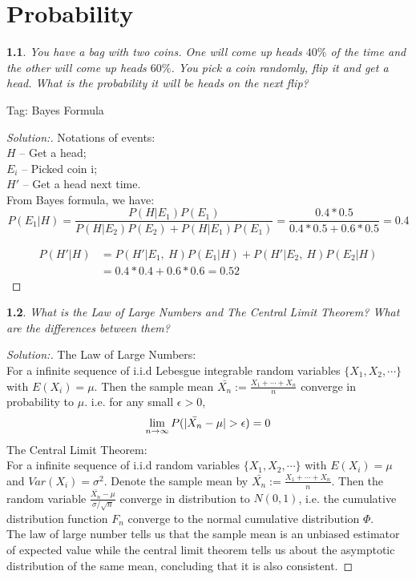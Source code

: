 \documentclass[10pt]{report}
\newtheorem{exe}{}[chapter]
\newenvironment{sol}{\begin{proof}[Solution:]}{\end{proof}}
\begin{document}
\chapter{Probability}

\begin{exe}
    You have a bag with two coins. One will come up heads $40\%$ of the time and the other will come up heads $60\%$. You pick a coin randomly, flip it and get a head. What is the probability it will be heads on the next flip?
\end{exe}
\begin{teacher}
Tag: Bayes Formula 
\begin{sol}
Notations of events:\\
$H$ -- Get a head;\\
$E_i$ -- Picked coin i;\\
$H'$ -- Get a head next time.\\
From Bayes formula, we have:
$$P(E_1|H) = \frac{P(H|E_1) P(E_1)} {P(H|E_2) P(E_2) + P(H|E_1) P(E_1)} = \frac{0.4*0.5}{0.4*0.5 + 0.6*0.5}= 0.4$$

\begin{equation*} \label{1}
\begin{split}
P(H'|H) & = P(H'|E_1,\ H)P(E_1|H) + P(H'|E_2,\ H)P(E_2|H) \\
 & = 0.4*0.4 + 0.6*0.6 = 0.52
\end{split}
\end{equation*} 
\end{sol}
\end{teacher}

\begin{exe}
What is the Law of Large Numbers and The Central Limit Theorem? What are the differences between them?
\end{exe}
\begin{teacher}
\begin{sol}
The Law of Large Numbers:\\
For a infinite sequence of i.i.d Lebesgue integrable random variables $\{X_1, X_2, \cdots\}$ with $E(X_i) = \mu$. Then the sample mean $\bar{X_n} := \frac{X_1+\cdots+X_n}{n}$ converge in probability to $\mu$. i.e. for any small $\epsilon>0$, 
$$\lim_{n\rightarrow \infty} P(|\Bar{X_n}-\mu| >\epsilon) = 0$$
The Central Limit Theorem:\\
For a infinite sequence of i.i.d random variables $\{X_1, X_2, \cdots\}$ with $E(X_i) = \mu$ and $Var(X_i) = \sigma^2$. Denote the sample mean by $\bar{X_n} := \frac{X_1+\cdots+X_n}{n}$. Then the random variable $\frac{\bar{X_n} - \mu}{\sigma/\sqrt{n}}$ converge in distribution to $N(0, 1)$, i.e. the cumulative distribution function $F_n$ converge to the normal cumulative distribution $\Phi$.\\
The law of large number tells us that the sample mean is an unbiased estimator of expected value while the central limit theorem tells us about the asymptotic distribution of the same mean, concluding that it is also consistent. 
\end{sol}
\end{teacher}
\end{document}

